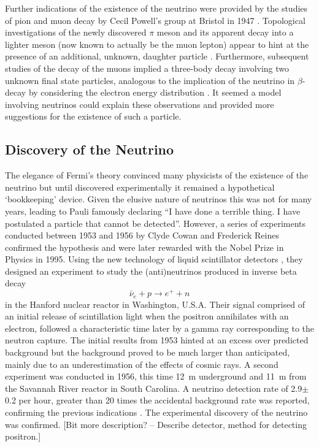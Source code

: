Further indications of the existence of the neutrino were provided by the studies of pion and muon decay by Cecil Powell's group at Bristol in 1947 \cite{Lattes1947-159,Lattes1947-160}.  Topological investigations of the newly discovered $\pi$ meson and its apparent decay into a lighter meson (now known to actually be the muon lepton) appear to hint at the presence of an additional, unknown, daughter particle \cite{Lattes1947-159}.  Furthermore, subsequent studies of the decay of the muons implied a three-body decay involving two unknown final state particles, analogous to the implication of the neutrino in $\beta$-decay by considering the electron energy distribution \cite{Brown1949}.  It seemed a model involving neutrinos could explain these observations and provided more suggestions for the existence of such a particle.

\subsection{Discovery of the Neutrino}\label{NeutrinoDiscovery}

The elegance of Fermi's theory convinced many physicists of the existence of the neutrino but until discovered experimentally it remained a hypothetical `bookkeeping' device.  Given the elusive nature of neutrinos this was not for many years, leading to Pauli famously declaring ``I have done a terrible thing. I have postulated a particle that cannot be detected''.  However, a series of experiments conducted between 1953 and 1956 by Clyde Cowan and Frederick Reines confirmed the hypothesis and were later rewarded with the Nobel Prize in Physics in 1995.  Using the new technology of liquid scintillator detectors \cite{ReinesCowanLiquidScintillation}, they designed an experiment \cite{ReinesCowan1953Proposal} to study the (anti)neutrinos produced in inverse beta decay
\begin{equation}\label{eq:InverseBetaDecay}
  {\bar{\nu}}_e + p \rightarrow e^+ + n
\end{equation}
in the Hanford nuclear reactor in Washington, U.S.A.  Their signal comprised of an initial release of scintillation light when the positron annihilates with an electron, followed a characteristic time later by a gamma ray corresponding to the neutron capture.  The initial results from 1953 \cite{ReinesCowan1953} hinted at an excess over predicted background but the background proved to be much larger than anticipated, mainly due to an underestimation of the effects of cosmic rays.  A second experiment was conducted in 1956, this time 12~m underground and 11~m from the Savannah River reactor in South Carolina.  A neutrino detection rate of 2.9$\pm$0.2 per hour, greater than 20 times the accidental background rate was reported, confirming the previous indications \cite{ReinesCowan1956}.  The experimental discovery of the neutrino was confirmed.  [Bit more description? -- Describe detector, method for detecting positron.]

